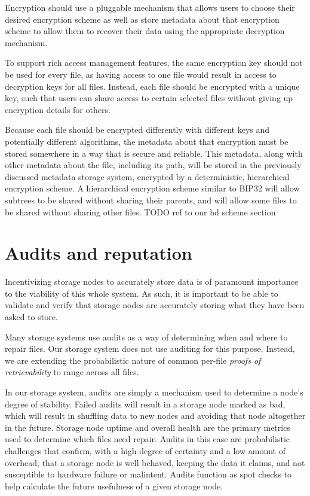 \documentclass[11pt,fleqn,openany]{book}
\newcommand{\todo}[1]{{\color{red} TODO #1 }}
\begin{document}
Encryption should use a pluggable mechanism that allows users to choose their
desired encryption scheme as well as store metadata about that encryption
scheme to allow them to recover their data using the appropriate decryption
mechanism.

To support rich access management features, the same encryption key should not
be used for every file, as having access to one file would result in access
to decryption keys for all files. Instead, each file should be encrypted with
a unique key, such that users can share access to certain selected files
without giving up encryption details for others.

Because each file should be encrypted differently with different keys and
potentially different algorithms, the metadata about that encryption must
be stored somewhere in a way that is secure and reliable. This metadata,
along with other metadata about the file, including its path, will
be stored in the previously discussed metadata storage system, encrypted
by a deterministic, hierarchical encryption scheme.
A hierarchical encryption scheme similar to
BIP32 \cite{bip32} will allow subtrees to be shared without sharing their
parents, and will allow some files to be shared without sharing other files.
\todo{ref to our hd scheme section}

\section{Audits and reputation}

Incentivizing storage nodes to accurately store data is of paramount importance
to
the viability of this whole system. As such, it is important to be able to
validate and verify that storage nodes are accurately storing what they have
been
asked to store.

Many storage systems use audits as a way of determining when and where to repair
files. Our storage system does not use auditing for this purpose.
Instead, we are extending the probabilistic nature of
common per-file {\em proofs of retrievability} \cite{proof-of-retrievability}
to range across all files.

In our storage system,
audits are simply a mechanism used to determine a node's degree of stability.
Failed audits will result in a storage node marked as bad, which
will result in shuffling data to new nodes and avoiding that node altogether
in the future. Storage node uptime and overall health are the primary metrics
used to determine which files need repair.
Audits in this case are probabilistic challenges that confirm, with a high
degree of certainty and a low amount of overhead, that a storage node is well
behaved, keeping the data it claims, and not susceptible to hardware
failure or malintent. Audits function as spot checks to help calculate
the future usefulness of a given storage node.
\end{document}
